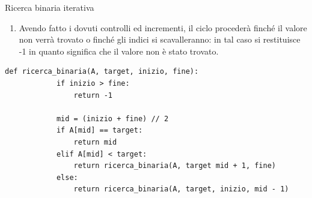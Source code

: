 \documentclass[12pt]{report}
\begin{document}
\begin{algoritmo}{Ricerca binaria iterativa}{}
\begin{enumerate}
\begin{enumerate}
    			\item Se il valore all’indice mid è maggiore di quello che stiamo cercando, dato che l’array è ordinato, significa che dovremo cercare nella metà sinistra dell’array. Proceduralmente questo si traduce decrementando il valore di  fine (ricordiamo che fine è l’indice che rappresenta la fine della sequenza che stiamo considerando). Impostiamo il nuovo indice di fine a mid -1 (chiaramente non a mid, dato che il valore nell’indice mid l’abbiamo già considerato nella prima condizione).

    		\end{enumerate}
    				
    		\item Avendo fatto i dovuti controlli ed incrementi, il ciclo procederà finché il valore non verrà trovato o finché gli indici si scavalleranno: in tal caso si restituisce -1 in quanto significa che il valore non è stato trovato.

    	\end{enumerate}
    			
    \end{algoritmo}
    		
    \begin{lstlisting}[caption={Versione ricorsiva della ricerca binaria}]
    	def ricerca_binaria(A, target, inizio, fine):
    		if inizio > fine:
    			return -1
    		
    		mid = (inizio + fine) // 2
    		if A[mid] == target:
    			return mid
    		elif A[mid] < target:
    			return ricerca_binaria(A, target mid + 1, fine)
    		else:
    			return ricerca_binaria(A, target, inizio, mid - 1)
    \end{lstlisting}
    		
\end{document}
